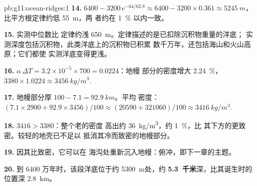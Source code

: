 \begin{solution}{pb:g11:ocean-ridges:1}
\textbf{14.} $6400 - 3200\,e^{-64/62.8} \approx 6400 - 3200 \times 0.361
\approx \qty{5245}{m}$，比平方根定律约低 \qty{55}{m}，两
者约在 \qty{1}{\percent} 以内一致。

\textbf{15.} 实测中位数比
定律约浅 \qty{650}{m}。定律描述的是已扣除沉积物重量的洋底；
实测深度包括沉积物，此类洋底上的沉积物已积累
数千万年，还包括海山和火山高原；它们都使
实测洋底变得更浅。

\textbf{16.} $\alpha\,\Delta T = 3.2 \times 10^{-5} \times 700 = 0.0224$：地幔
部分的密度增大 \qty{2.24}{\percent}，
$3380 \times 1.0224 \approx \qty{3456}{kg/m^3}$.

\textbf{17.} 地幔部分厚 $100 - 7.1 = \qty{92.9}{km}$。平均
密度：$(7.1 \times 2900 + 92.9 \times 3456)/100 \approx (20590 + 321060)/100
\approx \qty{3416}{kg/m^3}$.

\textbf{18.} $3416 > 3380$：整个老的密度
高出约 \qty{36}{kg/m^3}，约 \qty{1}{\percent}，比
其下方的更致密。较轻的地壳已不足以
抵消其冷而致密的地幔部分。

\textbf{19.} 因其比致密，它可以在
海沟处重新沉入地幔：俯冲，即下一章的主题。

\textbf{20.} 到 6400 万年时，该段洋底位于约
\qty{5300}{m}处，约 \textbf{5.3~千米}深，比其诞生时的位置深
\qty{2.8}{km}。
\end{solution}
